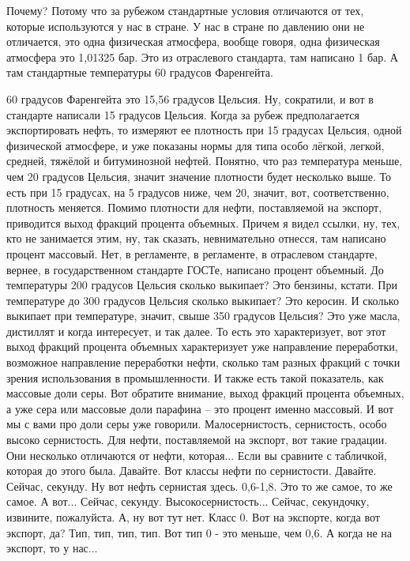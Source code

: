 \documentclass[main.tex]{subfiles}
\begin{document}
Почему? Потому что за рубежом стандартные условия отличаются от тех, которые используются у нас в стране.
У нас в стране по давлению они не отличается, это одна физическая атмосфера, вообще говоря, одна физическая атмосфера это 1,01325 бар.
Это из отраслевого стандарта, там написано 1 бар.
А там стандартные температуры 60 градусов Фаренгейта.

60 градусов Фаренгейта это 15,56 градусов Цельсия.
Ну, сократили, и вот в стандарте написали 15 градусов Цельсия.
Когда за рубеж предполагается экспортировать нефть, то измеряют ее плотность при 15 градусах Цельсия, одной физической атмосфере, и уже показаны нормы для типа особо лёгкой, легкой, средней, тяжёлой и битуминозной нефтей.
Понятно, что раз температура меньше, чем 20 градусов Цельсия, значит значение плотности будет несколько выше.
То есть при 15 градусах, на 5 градусов ниже, чем 20, значит, вот, соответственно, плотность меняется.
Помимо плотности для нефти, поставляемой на экспорт, приводится выход фракций процента объемных.
Причем я видел ссылки, ну, тех, кто не занимается этим, ну, так сказать, невнимательно отнесся, там написано процент массовый.
Нет, в регламенте, в регламенте, в отраслевом стандарте, вернее, в государственном стандарте ГОСТе, написано процент объемный.
До температуры 200 градусов Цельсия сколько выкипает?
Это бензины, кстати.
При температуре до 300 градусов Цельсия сколько выкипает?
Это керосин.
И сколько выкипает при температуре, значит, свыше 350 градусов Цельсия?
Это уже масла, дистиллят и когда интересует, и так далее.
То есть это характеризует, вот этот выход фракций процента объемных характеризует уже направление переработки, возможное направление переработки нефти, сколько там разных фракций с точки зрения использования в промышленности.
И также есть такой показатель, как массовые доли серы.
Вот обратите внимание, выход фракций процента объемных, а уже сера или массовые доли парафина -- это процент именно массовый.
И вот мы с вами про доли серы уже говорили.
Малосернистость, сернистость, особо высоко сернистость.
Для нефти, поставляемой на экспорт, вот такие градации.
Они несколько отличаются от нефти, которая...
Если вы сравните с табличкой, которая до этого была.
Давайте.
Вот классы нефти по сернистости.
Давайте.
Сейчас, секунду.
Ну вот нефть сернистая здесь.
0,6-1,8.
Это то же самое, то же самое.
А вот...
Сейчас, секунду.
Высокосернистость...
Сейчас, секундочку, извините, пожалуйста.
А, ну вот тут нет.
Класс 0.
Вот на экспорте, когда вот экспорт, да?
Тип, тип, тип, тип.
Вот тип 0 - это меньше, чем 0,6.
А когда не на экспорт, то у нас...
\end{document}
